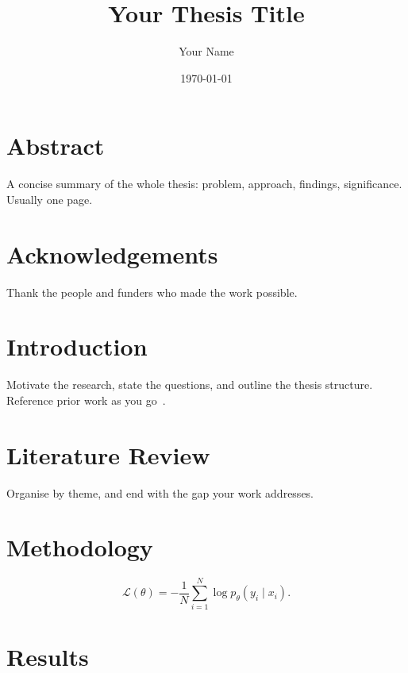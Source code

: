 \documentclass[12pt,a4paper,oneside]{report}
\title{Your Thesis Title}
\author{Your Name}
\date{\today}
\begin{document}
\maketitle

\chapter*{Abstract}
A concise summary of the whole thesis: problem, approach, findings,
significance. Usually one page.

\chapter*{Acknowledgements}
Thank the people and funders who made the work possible.

\tableofcontents
\listoffigures
\listoftables

\cleardoublepage
{}

\chapter{Introduction}
\label{ch:introduction}

Motivate the research, state the questions, and outline the thesis
structure. Reference prior work as you go~\cite{knuth1984}.

\chapter{Literature Review}
\label{ch:literature}

Organise by theme, and end with the gap your work addresses.

\chapter{Methodology}
\label{ch:methodology}

\begin{equation}
  \label{eq:example}
  \mathcal{L}(\theta) = -\frac{1}{N}\sum_{i=1}^{N} \log p_\theta(y_i \mid x_i) .
\end{equation}

\chapter{Results}
\label{ch:results}
\end{document}
